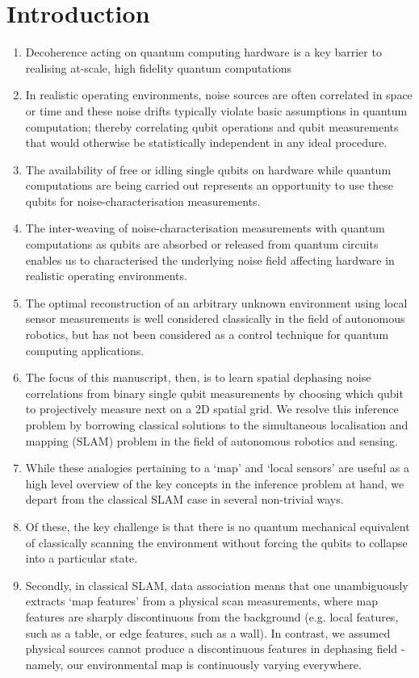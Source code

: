 \iffalse
\section{Introduction}

\begin{enumerate}
	\item Decoherence acting on quantum computing hardware is a key barrier to realising at-scale, high fidelity quantum computations 
	\item In realistic operating environments, noise sources are often correlated in space or time and these noise drifts typically violate basic assumptions in quantum computation;  thereby correlating qubit operations and qubit measurements that would otherwise be statistically independent in any ideal procedure. 
	\item The availability of free or idling single qubits on hardware while quantum computations are being carried out represents an opportunity to use these qubits for noise-characterisation measurements.
	\item The inter-weaving of noise-characterisation measurements with quantum computations as qubits are absorbed or released from quantum circuits enables us to characterised the underlying noise field affecting hardware in realistic operating environments.
	\item The optimal reconstruction of an arbitrary unknown environment using local sensor measurements is well considered classically in the field of autonomous robotics, but has not been considered as a control technique for quantum computing applications.
	\item The focus of this manuscript, then, is to learn spatial dephasing noise correlations from binary single qubit measurements by choosing which qubit to projectively measure next on a 2D spatial grid. We resolve this inference problem by borrowing classical solutions to the simultaneous localisation and mapping (SLAM) problem in the field of autonomous robotics and sensing. 
	\item While these analogies pertaining to a `map' and `local sensors' are useful as a high level overview of the key concepts in the inference problem at hand, we depart from the classical SLAM case in several non-trivial ways. 
	\item Of these, the key challenge is that there is no quantum mechanical equivalent of classically scanning the environment without forcing the qubits to collapse into a particular state. 
	\item Secondly, in classical SLAM,  data association means that one unambiguously  extracts `map features' from a physical scan measurements, where map features are sharply discontinuous from the background (e.g. local features, such as a table, or edge features, such as a wall). In contrast, we assumed physical sources cannot produce a discontinuous features in dephasing field - namely, our environmental map is  continuously varying everywhere.

\end{enumerate}
